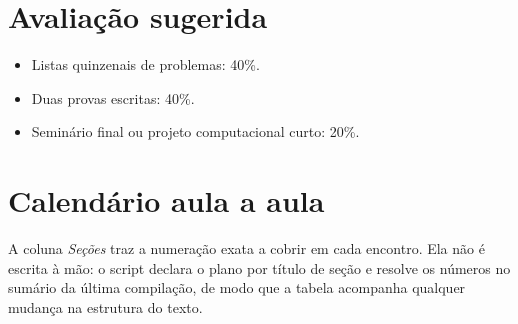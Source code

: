 \documentclass[12pt,a4paper,oneside]{book}
\theoremstyle{rgplain}
\theoremstyle{rgremark}
\begin{document}
\section*{Avaliação sugerida}
{}

\begin{itemize}
  \item Listas quinzenais de problemas: 40\%.
  \item Duas provas escritas: 40\%.
  \item Seminário final ou projeto computacional curto: 20\%.
\end{itemize}

\section*{Calendário aula a aula}
{}
\label{sec:calendario}

A coluna \emph{Seções} traz a numeração exata a cobrir em cada encontro. Ela não é escrita à mão: o script  declara o plano por título de seção e resolve os números no sumário da última compilação, de modo que a tabela acompanha qualquer mudança na estrutura do texto.
\end{document}
